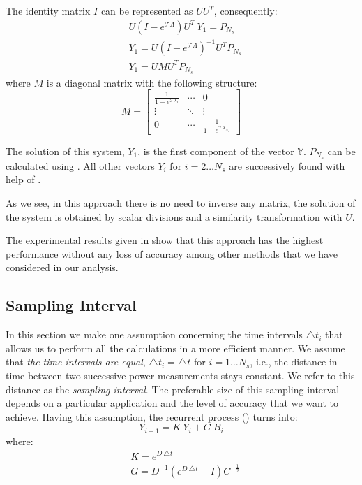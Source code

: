 The identity matrix $I$ can be represented as $U U^T$, consequently:
\begin{align*}
  & U (I - e^{\mathcal{T} \Lambda}) U^T \: Y_1 = P_{N_s} \\
  & Y_1 = U (I - e^{\mathcal{T} \Lambda})^{-1} U^T P_{N_s} \\
  & Y_1 = U M U^T P_{N_s}
\end{align*}
where $M$ is a diagonal matrix with the following structure:
\[
  M = \left[
    \begin{array}{ccc}
      \frac{1}{1 - e^{\mathcal{T} \lambda_1}} & \cdots & 0 \\
      \vdots & \ddots & \vdots \\
      0 & \cdots & \frac{1}{1 - e^{\mathcal{T} \lambda_{N_n}}}
    \end{array}
  \right]
\]

The solution of this system, $Y_1$, is the first component of the vector $\mathbb{Y}$. $P_{N_s}$ can be calculated using . All other vectors $Y_i$ for $i = 2 \dots N_s$ are successively found with help of .

As we see, in this approach there is no need to inverse any matrix, the solution of the system is obtained by scalar divisions and a similarity transformation with $U$.

The experimental results given in  show that this approach has the highest performance without any loss of accuracy among other methods that we have considered in our analysis.

\subsection{Sampling Interval}
In this section we make one assumption concerning the time intervals $\triangle t_i$ that allows us to perform all the calculations in a more efficient manner. We assume that \emph{the time intervals are equal}, $\triangle t_i = \triangle t$ for $i = 1 \dots N_s$, i.e., the distance in time between two successive power measurements stays constant. We refer to this distance as the \emph{sampling interval}. The preferable size of this sampling interval depends on a particular application and the level of accuracy that we want to achieve. Having this assumption, the recurrent process () turns into:
\[
  Y_{i+1} = K \: Y_i + G \: B_i
\]
where:
\begin{align*}
  & K = e^{D \: \triangle t} \\
  & G = D^{-1} \left( e^{D \: \triangle t} - I \right) C^{-\frac{1}{2}}
\end{align*}

